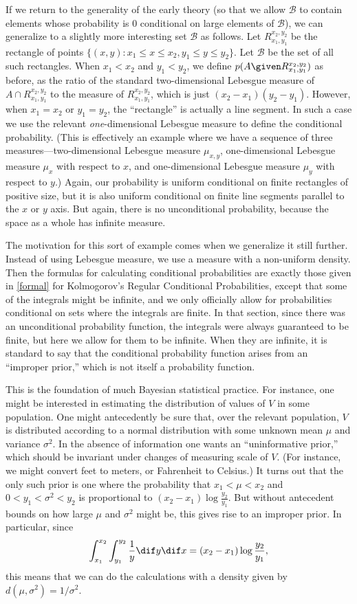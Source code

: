 If we return to the generality of the early theory (so that we allow $\mathcal{B}$ to contain elements whose probability is $0$ conditional on large elements of $\mathcal{B}$), we can generalize to a slightly more interesting set $\mathcal{B}$ as follows. Let $R_{x_1,y_1}^{x_2,y_2}$ be the rectangle of points $\{(x,y)\colon x_1\leq x\leq x_2, y_1\leq y\leq y_2\}$. Let $\mathcal{B}$ be the set of all such rectangles. When $x_1<x_2$ and $y_1<y_2$, we define $p(A \given R_{x_1,y_1}^{x_2,y_2})$ as before, as the ratio of the standard two-dimensional Lebesgue measure of $A\cap R_{x_1,y_1}^{x_2,y_2}$ to the measure of $R_{x_1,y_1}^{x_2,y_2}$, which is just $(x_2-x_1)(y_2-y_1)$. However, when $x_1=x_2$ or $y_1=y_2$, the ``rectangle'' is actually a line segment. In such a case we use the relevant \emph{one}-dimensional Lebesgue measure to define the conditional probability. (This is effectively an example where we have a sequence of three measures---two-dimensional Lebesgue measure $\mu_{x,y}$, one-dimensional Lebesgue measure $\mu_x$ with respect to $x$, and one-dimensional Lebesgue measure $\mu_y$ with respect to $y$.) Again, our probability is uniform conditional on finite rectangles of positive size, but it is also uniform conditional on finite line segments parallel to the $x$ or $y$ axis. But again, there is no unconditional probability, because the space as a whole has infinite measure.

The motivation for this sort of example comes when we generalize it still further. Instead of using Lebesgue measure, we use a measure with a non-uniform density. Then the formulas for calculating conditional probabilities are exactly those given in \autoref{formal} for Kolmogorov's Regular Conditional Probabilities, except that some of the integrals might be infinite, and we only officially allow for probabilities conditional on sets where the integrals are finite. In that section, since there was an unconditional probability function, the integrals were always guaranteed to be finite, but here we allow for them to be infinite. When they are infinite, it is standard to say that the conditional probability function arises from an ``improper prior,'' which is not itself a probability function.

This is the foundation of much Bayesian statistical practice. For instance, one might be interested in estimating the distribution of values of $V$ in some population. One might antecedently be sure that, over the relevant population, $V$ is distributed according to a normal distribution with some unknown mean $\mu$ and variance $\sigma^2$. In the absence of information one wants an ``uninformative prior,'' which should be invariant under changes of measuring scale of $V$. (For instance, we might convert feet to meters, or Fahrenheit to Celsius.) It turns out that the only such prior is one where the probability that $x_1<\mu<x_2$ and $0<y_1<\sigma^2<y_2$ is proportional to $(x_2-x_1)\log\frac{y_2}{y_1}$. But without antecedent bounds on how large $\mu$ and $\sigma^2$ might be, this gives rise to an improper prior. In particular, since
$$\int_{x_1}^{x_2}\int_{y_1}^{y_2}\frac{1}{y} \dif y \dif x = (x_2-x_1)\log\frac{y_2}{y_1},$$
this means that we can do the calculations with a density given by $d(\mu,\sigma^2)=1/\sigma^2$.

